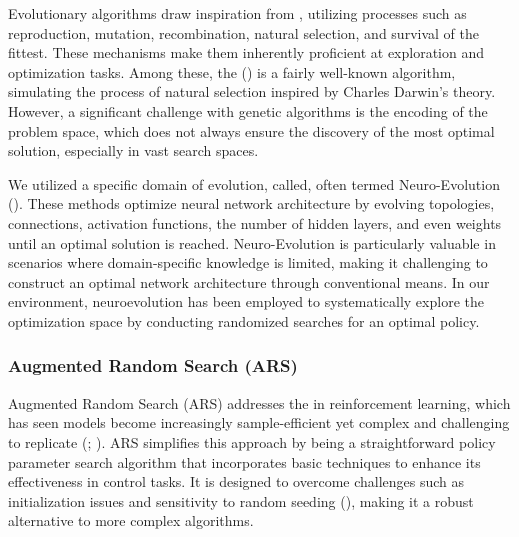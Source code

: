         \bigskip
        
        \noindent Evolutionary algorithms draw inspiration from , utilizing processes such as reproduction, mutation, recombination, natural selection, and survival of the fittest. These mechanisms make them inherently proficient at exploration and optimization tasks. Among these, the  (\textcolor{deepblue}{\cite{1975Holland}}) is a fairly well-known algorithm, simulating the process of natural selection inspired by Charles Darwin’s theory. However, a significant challenge with genetic algorithms is the encoding of the problem space, which does not always ensure the discovery of the most optimal solution, especially in vast search spaces.
        
        \bigskip
        
        \noindent We utilized a specific domain of evolution, called, often termed Neuro-Evolution (\textcolor{deepblue}{\cite{Galvan_2021}}). These methods optimize neural network architecture by evolving topologies, connections, activation functions, the number of hidden layers, and even weights until an optimal solution is reached. Neuro-Evolution is particularly valuable in scenarios where domain-specific knowledge is limited, making it challenging to construct an optimal network architecture through conventional means. In our environment, neuroevolution has been employed to systematically explore the optimization space by conducting randomized searches for an optimal policy.

        \subsubsection{Augmented Random Search (ARS)}
        \label{sec:ars}
    
            \noindent Augmented Random Search (ARS) addresses the in reinforcement learning, which has seen models become increasingly sample-efficient yet complex and challenging to replicate (\textcolor{deepblue}{\cite{mania2018simple}; \cite{stable-baselines3}}). ARS simplifies this approach by being a straightforward policy parameter search algorithm that incorporates basic techniques to enhance its effectiveness in control tasks. It is designed to overcome challenges such as initialization issues and sensitivity to random seeding (\textcolor{deepblue}{\cite{henderson2019deep}}), making it a robust alternative to more complex algorithms.
            
